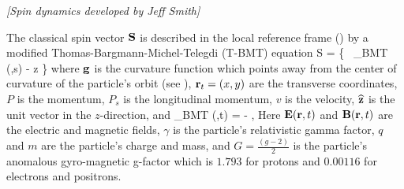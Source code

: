 \textit{\large [Spin dynamics developed by Jeff Smith]}

The classical spin vector ${\bf S}$ is described in the   
local reference frame () by a
modified Thomas-Bargmann-Michel-Telegdi (T-BMT) equation\cite{b:spin}
\Begineq
   \Bf S = 
  \left\{  \, 
  {\pmb\Omega}_{BMT} (,s) - \bfg \times \bfhat z \right\} \times {}
\Endeq
where ${\bf g}$ is the curvature function which points away from the
center of curvature of the particle's orbit (see
), ${\bf r}_t = (x, y)$ are the transverse
coordinates, $P$ is the momentum, $P_s$ is the longitudinal momentum,
$v$ is the velocity, ${\widehat{\bf z}}$ is the unit vector in the
$z$-direction, and
\Begineq
  {\pmb\Omega}_{BMT} (,t) = -  ,   
\Endeq  
Here ${\bf E} ({\bf r} ,t)$ and ${\bf B} ({\bf r} ,t)$ are the electric and
magnetic fields, $\gamma$ is the particle's relativistic gamma factor,
$q$ and $m$ are the particle's charge and mass, and $G =
\frac{\left(g-2\right)}{2}$ is the particle's anomalous gyro-magnetic
g-factor which is $1.793$ for protons and $0.00116$ for electrons and
positrons.
   
